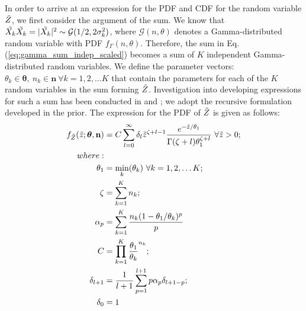 In order to arrive at an expression for the PDF and CDF for the random variable $\Tilde{Z}$, we first consider the argument of the sum. We know that $\Tilde{X_k}\Tilde{X_k} = \vert \Tilde{X_k}\vert^2\sim\mathcal{G}(1/2, 2\sigma_k^2)$, where $\mathcal{G}(n,\theta)$ denotes a Gamma-distributed random variable with PDF $f_\Gamma(n,\theta)$. Therefore, the sum in Eq. (\ref{eq:gamma_sum_indep_scaled}) becomes a sum of $K$ independent Gamma-distributed random variables. We define the parameter vectors: $\theta_k \in \boldsymbol{\theta},\ n_k \in \textbf{n} \ \forall k = 1,2,\ldots K$ that contain the parameters for each of the $K$ random variables in the sum forming $\Tilde{Z}$. Investigation into developing expressions for such a sum has been conducted in \cite{Moschopoulos1985} and \cite{Mathai1982}; we adopt the recursive formulation developed in the prior. The expression for the PDF of $\Tilde{Z}$ is given as follows:\\
\begin{equation}\label{eq:gamma_sum_indep_scaled_pdf}
    \begin{aligned}
        f_{\Tilde{Z}}(\Tilde{z};\boldsymbol{\theta},\textbf{n}) &= C\sum_{l = 0}^\infty \delta_l \Tilde{z}^{\zeta+l-1}\frac{e^{-\Tilde{z}/\theta_1}}{\Gamma(\zeta+l)\theta_1^{\zeta+l}} \ \forall \Tilde{z} > 0; \\
        where:\\
        \theta_1 &= \min_k(\theta_k) \ \forall k=1,2,\ldots K;\\
        \zeta &= \sum_{k = 1}^K n_k;\\
        \alpha_p &= \sum_{k = 1}^K \frac{n_k(1-\theta_1/\theta_k)^p}{p}\\
        C &= \prod_{k = 1}^K \frac{\theta_1}{\theta_k}^{n_k};\\
        \delta_{l+1} &= \frac{1}{l+1}\sum_{p = 1}^{l+1} p\alpha_p\delta_{l+1-p};\\
        \delta_0 &= 1
    \end{aligned}
\end{equation}

\newpage
